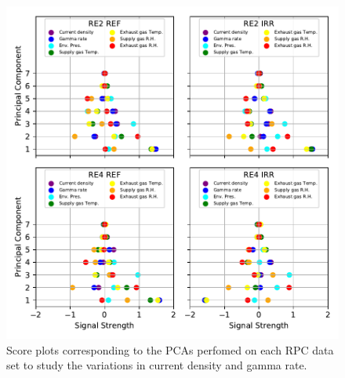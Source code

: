 \endgroup
	
	\begin{figure}[H]
    	\centering
		\includegraphics[width = \linewidth]{fig/chapt5/Full-Data-variation-Scores.pdf}
        \caption{\label{fig:GIFpp-Score_FullData} Score plots corresponding to the PCAs perfomed on each RPC data set to study the variations in current density and gamma rate.}
	\end{figure}

